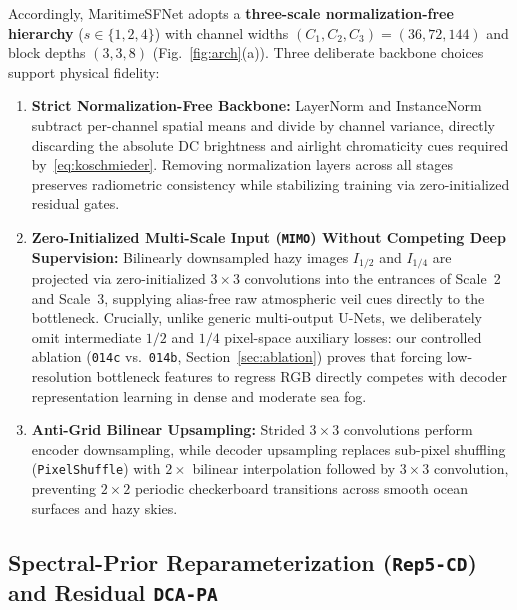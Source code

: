 \documentclass[journal,twoside]{IEEEtran}
\begin{document}
Accordingly, MaritimeSFNet adopts a \textbf{three-scale normalization-free hierarchy} ($s\in\{1, 2, 4\}$) with channel widths $(C_1, C_2, C_3) = (36, 72, 144)$ and block depths $(3, 3, 8)$ (Fig.~\ref{fig:arch}(a)). Three deliberate backbone choices support physical fidelity:
\begin{enumerate}
    \item \textbf{Strict Normalization-Free Backbone:} LayerNorm and InstanceNorm subtract per-channel spatial means and divide by channel variance, directly discarding the absolute DC brightness and airlight chromaticity cues required by~\eqref{eq:koschmieder}. Removing normalization layers across all stages preserves radiometric consistency while stabilizing training via zero-initialized residual gates.
    \item \textbf{Zero-Initialized Multi-Scale Input (\texttt{MIMO}) Without Competing Deep Supervision:} Bilinearly downsampled hazy images $I_{1/2}$ and $I_{1/4}$ are projected via zero-initialized $3\times 3$ convolutions into the entrances of Scale~2 and Scale~3, supplying alias-free raw atmospheric veil cues directly to the bottleneck. Crucially, unlike generic multi-output U-Nets, we deliberately omit intermediate $1/2$ and $1/4$ pixel-space auxiliary losses: our controlled ablation (\texttt{014c} vs.\ \texttt{014b}, Section~\ref{sec:ablation}) proves that forcing low-resolution bottleneck features to regress RGB directly competes with decoder representation learning in dense and moderate sea fog.
    \item \textbf{Anti-Grid Bilinear Upsampling:} Strided $3\times 3$ convolutions perform encoder downsampling, while decoder upsampling replaces sub-pixel shuffling (\texttt{PixelShuffle}) with $2\times$ bilinear interpolation followed by $3\times 3$ convolution, preventing $2\times 2$ periodic checkerboard transitions across smooth ocean surfaces and hazy skies.
\end{enumerate}

\subsection{Spectral-Prior Reparameterization (\texorpdfstring{\texttt{Rep5-CD}}{Rep5-CD}) and Residual \texorpdfstring{\texttt{DCA-PA}}{DCA-PA}}
\label{sec:rep5}
\end{document}

